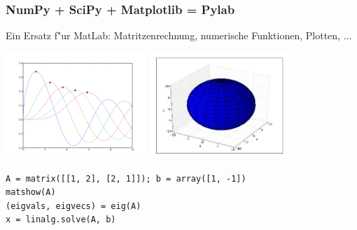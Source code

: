 \begin{frame}[fragile]
\frametitle{NumPy + SciPy + Matplotlib = Pylab}
Ein Ersatz f"ur MatLab: Matritzenrechnung, numerische Funktionen, Plotten, ...

\includegraphics[height=4cm]{images/matplotlib.png}
\includegraphics[height=4cm]{images/surface.jpg}

\begin{lstlisting}[style=Python, basicstyle=\small]
A = matrix([[1, 2], [2, 1]]); b = array([1, -1])
matshow(A)
(eigvals, eigvecs) = eig(A)
x = linalg.solve(A, b)
\end{lstlisting}
\end{frame}

